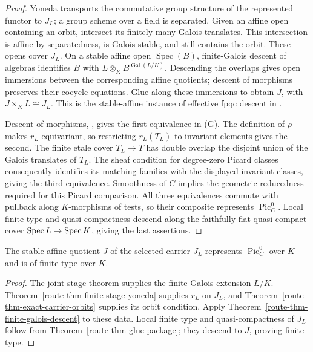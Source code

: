 \begin{proof}
  Yoneda transports the commutative group structure of the represented
  functor to \(J_L\); a group scheme over a field is separated. Given
  an affine open containing an orbit, intersect its finitely many Galois
  translates. This intersection is affine by separatedness, is
  Galois-stable, and still contains the orbit. These opens cover \(J_L\).
  On a stable affine open \(\operatorname{Spec}(B)\), finite-Galois
  descent of algebras identifies \(B\) with
  \(L\otimes_K B^{\operatorname{Gal}(L/K)}\). Descending the overlaps
  gives open immersions between the corresponding affine quotients;
  descent of morphisms preserves their cocycle equations. Glue along
  these immersions to obtain \(J\), with \(J\times_K L\cong J_L\).
  This is the stable-affine instance of effective fpqc descent in
  \cite[Tag 0246]{stacks-project}.

  Descent of morphisms, \cite[Tag 040L]{stacks-project}, gives the first
  equivalence in (G). The definition of \(\rho\) makes \(r_L\)
  equivariant, so restricting \(r_L(T_L)\) to invariant elements gives
  the second. The finite etale cover \(T_L\to T\) has double overlap
  the disjoint union of the Galois translates of \(T_L\). The sheaf
  condition for degree-zero Picard classes consequently identifies its
  matching families with the displayed invariant classes, giving the
  third equivalence. Smoothness of \(C\) implies the geometric
  reducedness required for this Picard comparison. All three
  equivalences commute with pullback along \(K\)-morphisms of tests,
  so their composite represents \(\operatorname{Pic}^0_C\).
  Local finite type and quasi-compactness descend along the faithfully
  flat quasi-compact cover \(\operatorname{Spec} L\to\operatorname{Spec} K\), giving the last
  assertions.
\end{proof}

\begin{corollary}
  \label{route-thm-original-field-representability}
  \notready

  The stable-affine quotient \(J\) of the selected carrier \(J_L\)
  represents \(\operatorname{Pic}^0_C\) over \(K\) and is of finite
  type over \(K\).
\end{corollary}

\begin{proof}
  The joint-stage theorem supplies the finite Galois extension \(L/K\).
  Theorem~\ref{route-thm-finite-stage-yoneda} supplies \(r_L\) on
  \(J_L\), and Theorem~\ref{route-thm-exact-carrier-orbits} supplies
  its orbit condition. Apply
  Theorem~\ref{route-thm-finite-galois-descent} to these data.
  Local finite type and quasi-compactness of \(J_L\) follow from
  Theorem~\ref{route-thm-glue-package}; they descend to \(J\), proving
  finite type.
\end{proof}

